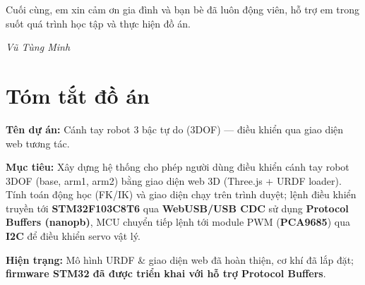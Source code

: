 \documentclass[12pt, a4paper, oneside]{report}
\numberwithin{equation}{chapter} %
\numberwithin{figure}{chapter}   %
\numberwithin{table}{chapter}    %
\begin{document}
Cuối cùng, em xin cảm ơn gia đình và bạn bè đã luôn động viên, hỗ trợ em trong suốt quá trình học tập và thực hiện đồ án.

\vspace{2cm}
\hfill \textit{Vũ Tùng Minh}

\chapter*{Tóm tắt đồ án}

\textbf{Tên dự án:} Cánh tay robot 3 bậc tự do (3DOF) — điều khiển qua giao diện web tương tác.

\textbf{Mục tiêu:} Xây dựng hệ thống cho phép người dùng điều khiển cánh tay robot 3DOF (base, arm1, arm2) bằng giao diện web 3D (Three.js + URDF loader). Tính toán động học (FK/IK) và giao diện chạy trên trình duyệt; lệnh điều khiển truyền tới \textbf{STM32F103C8T6} qua \textbf{WebUSB/USB CDC} sử dụng \textbf{Protocol Buffers (nanopb)}, MCU chuyển tiếp lệnh tới module PWM (\textbf{PCA9685}) qua \textbf{I2C} để điều khiển servo vật lý.

\textbf{Hiện trạng:} Mô hình URDF \& giao diện web đã hoàn thiện, cơ khí đã lắp đặt; \textbf{firmware STM32 đã được triển khai với hỗ trợ Protocol Buffers}.

\cleardoublepage
\tableofcontents %

\cleardoublepage
\listoffigures %


\cleardoublepage
\lstlistoflistings %


\cleardoublepage
{} %
\end{document}
